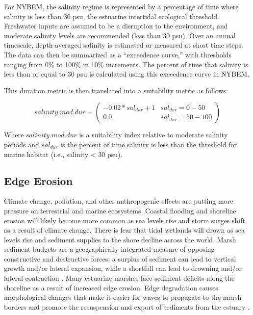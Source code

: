 \documentclass[
]{book}
\begin{document}
For NYBEM, the salinity regime is represented by a percentage of time where salinity is less than 30 psu, the estuarine intertidal ecological threshold. Freshwater inputs are assumed to be a disruption to the environment, and moderate salinity levels are recommended (less than 30 psu). Over an annual timescale, depth-averaged salinity is estimated or measured at short time steps. The data can then be summarized as a ``exceedence curve,'' with thresholds ranging from 0\% to 100\% in 10\% increments. The percent of time that salinity is less than or equal to 30 psu is calculated using this exceedence curve in NYBEM.

This duration metric is then translated into a suitability metric as follows:

\[salinity.mod.dur = \begin{pmatrix} -0.02*sal_{dur}+1 & sal_{dur}=0-50\\
0.0 & sal_{dur}=50-100
\end{pmatrix}\]

Where \(salinity.mod.dur\) is a suitability index relative to moderate salinity periods and \(sal_{dur}\) is the percent of time salinity is less than the threshold for marine habitat (i.e., salinity \textless{} 30 psu).

\hypertarget{edge-erosion}{%
\subsection{Edge Erosion}\label{edge-erosion}}

Climate change, pollution, and other anthropogenic effects are putting more pressure on terrestrial and marine ecosystems. Coastal flooding and shoreline erosion will likely become more common as sea levels rise and storm surges shift as a result of climate change. There is fear that tidal wetlands will drown as sea levels rise and sediment supplies to the shore decline across the world. Marsh sediment budgets are a geographically integrated measure of opposing constructive and destructive forces: a surplus of sediment can lead to vertical growth and/or lateral expansion, while a shortfall can lead to drowning and/or lateral contraction \citep{ganju_spatially_2017}. Many estuarine marshes face sediment deficits along the shoreline as a result of increased edge erosion. Edge degradation causes morphological changes that make it easier for waves to propagate to the marsh borders and promote the resuspension and export of sediments from the estuary \citep{li_wave-driven_2019}.
\end{document}
